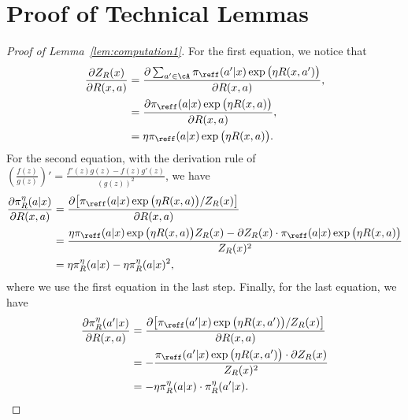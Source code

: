 \documentclass[11pt]{article}
\begin{document}
\section{Proof of Technical Lemmas}\label{s:Technical lemma proof}
\begin{proof}[Proof of Lemma~\ref{lem:computation1}]
    For the first equation, we notice that 
    $$
\begin{aligned}
        \frac{\partial Z_R(x)}{\partial R(x,a)} &= \frac{\partial \sum_{a' \in \cA} \pi_{\reff}(a'|x) \exp\big(\eta R(x,a')\big)}{\partial R(x,a)}, \\
        &= \frac{\partial \pi_{\reff}(a|x) \exp\big(\eta R(x,a)\big)}{\partial R(x,a)},\\
        &= \eta \pi_{\reff}(a|x) \exp\big(\eta R(x,a)\big).
\end{aligned}
    $$
For the second equation, with the derivation rule of $(\frac{f(z)}{g(z)})' = \frac{f'(z)g(z) - f(z)g'(z)}{(g(z))^2}$, we have
$$
\begin{aligned}
     \frac{\partial \pi^\eta_R(a|x)}{\partial R(x,a)} &= \frac{\partial \big[\pi_{\reff}(a|x) \exp\big(\eta R(x,a)\big) / Z_R(x)\big]}{\partial R(x,a)}\\
     &= \frac{\eta \pi_{\reff}(a|x) \exp\big(\eta R(x,a)\big) Z_R(x) - \partial Z_R(x) \cdot \pi_{\reff}(a|x) \exp\big(\eta R(x,a)\big)}{Z_R(x)^2}\\
     &= \eta \pi_R^\eta(a|x) - \eta \pi_R^\eta(a|x)^2,
\end{aligned}
$$
where we use the first equation in the last step. Finally, for the last equation, we have
$$
\begin{aligned}
     \frac{\partial \pi^\eta_R(a'|x)}{\partial R(x,a)} &= \frac{\partial \big[\pi_{\reff}(a'|x) \exp\big(\eta R(x,a')\big) / Z_R(x)\big]}{\partial R(x,a)} \\
     &= -\frac{\pi_{\reff}(a'|x) \exp\big(\eta R(x,a')\big) \cdot \partial Z_R(x)}{Z_R(x)^2}\\
     &= -\eta \pi_R^\eta(a|x) \cdot \pi_R^\eta(a'|x).
\end{aligned}
$$
\end{proof}
\end{document}
